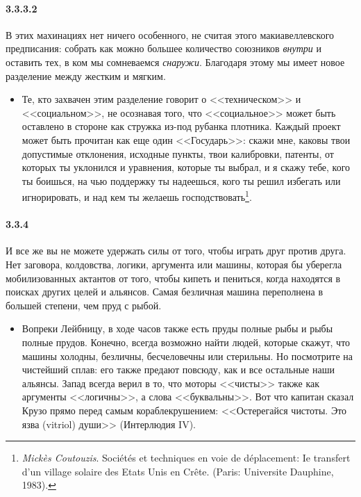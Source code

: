 \paragraph{3.3.3.2}\hypertarget{par:3.3.3.2}{} В этих махинациях нет ничего особенного, не считая этого макиавеллевского предписания: собрать как можно большее количество союзников {\itshape внутри} и оставить тех, в ком мы сомневаемся {\itshape снаружи}. Благодаря этому мы имеет новое разделение между жестким и мягким.
	\begin{itemize}
	\item 
	Те, кто захвачен этим разделение говорит о <<техническом>> и <<социальном>>, не осознавая того, что <<социальное>> может быть оставлено в стороне как стружка из-под рубанка плотника. Каждый проект может быть прочитан как еще один <<Государь>>: скажи мне, каковы твои допустимые отклонения, исходные пункты, твои калибровки, патенты, от которых ты уклонился и уравнения, которые ты выбрал, и я скажу тебе, кого ты боишься, на чью поддержку ты надеешься, кого ты решил избегать или игнорировать, и над кем ты желаешь господствовать\footnote{{\itshape Mick{\`e}s Coutouzis}. Soci{\'e}t{\'e}s et techniques en voie de d{\'e}placement: Ie transfert d'un village solaire des Etats Unis en Cr\^ete. (Paris: Universite Dauphine, 1983).}.
	\end{itemize}

\paragraph{3.3.4}\hypertarget{par:3.3.4}{} И все же вы не можете удержать силы от того, чтобы играть друг против друга. Нет заговора, колдовства, логики, аргумента или машины, которая бы уберегла мобилизованных актантов от того, чтобы кипеть и пениться, когда находятся в поисках других целей и альянсов. Самая безличная машина переполнена в большей степени, чем пруд с рыбой.
	\begin{itemize}
	\item 
	Вопреки Лейбницу, в ходе часов также есть пруды полные рыбы и рыбы полные прудов. Конечно, всегда возможно найти людей, которые скажут, что машины холодны, безличны, бесчеловечны или стерильны. Но посмотрите на чистейший сплав: его также предают повсюду, как и все остальные наши альянсы. Запад всегда верил в то, что моторы <<чисты>> также как аргументы <<логичны>>, а слова <<буквальны>>. Вот что капитан сказал Крузо прямо перед самым кораблекрушением: <<Остерегайся чистоты. Это язва (vitriol) души>> (Интерлюдия IV).
	\end{itemize}

